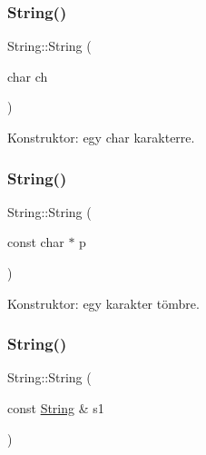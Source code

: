 \mbox{\label{class_string_a62a77180f8df2547e8be1313654abcee}} 
\subsubsection{\texorpdfstring{String()}{String()}\hspace{0.1cm}{\footnotesize\ttfamily [2/4]}}
{\footnotesize\ttfamily String\+::\+String (\begin{DoxyParamCaption}\item[{char}]{ch }\end{DoxyParamCaption})}



Konstruktor\+: egy char karakterre. 

\mbox{\label{class_string_a09ca4f1436a83ecb1c273a836b7cd4c6}} 
\subsubsection{\texorpdfstring{String()}{String()}\hspace{0.1cm}{\footnotesize\ttfamily [3/4]}}
{\footnotesize\ttfamily String\+::\+String (\begin{DoxyParamCaption}\item[{const char $\ast$}]{p }\end{DoxyParamCaption})}



Konstruktor\+: egy karakter tömbre. 

\mbox{\label{class_string_a3c682dc983b45bdbb7f3858fe4cbf221}} 
\subsubsection{\texorpdfstring{String()}{String()}\hspace{0.1cm}{\footnotesize\ttfamily [4/4]}}
{\footnotesize\ttfamily String\+::\+String (\begin{DoxyParamCaption}\item[{const \mbox{\hyperlink{class_string}{String}} \&}]{s1 }\end{DoxyParamCaption})}



